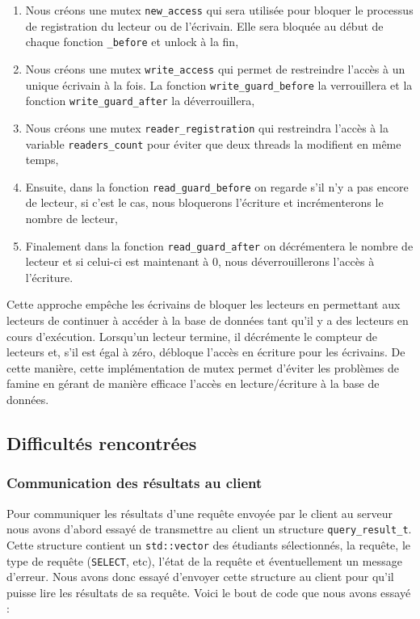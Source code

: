 \documentclass[utf8]{article}
\begin{document}
\begin{enumerate}
	\item Nous créons une mutex \texttt{new\_access} qui sera utilisée pour bloquer le processus de registration du lecteur ou de l'écrivain. Elle sera bloquée au début de chaque fonction \texttt{\_before} et unlock à la fin,
	\item Nous créons une mutex \texttt{write\_access} qui permet de restreindre l'accès à un unique écrivain à la fois. La fonction \texttt{write\_guard\_before} la verrouillera et la fonction \texttt{write\_guard\_after} la déverrouillera,
	\item Nous créons une mutex \texttt{reader\_registration} qui restreindra l'accès à la variable \texttt{readers\_count} pour éviter que deux threads la modifient en même temps,
	\item Ensuite, dans la fonction \texttt{read\_guard\_before} on regarde s'il n'y a pas encore de lecteur, si c'est le cas, nous bloquerons l'écriture et incrémenterons le nombre de lecteur,
	\item Finalement dans la fonction \texttt{read\_guard\_after} on décrémentera le nombre de lecteur et si celui-ci est maintenant à 0, nous déverrouillerons l'accès à l'écriture.
\end{enumerate}

Cette approche empêche les écrivains de bloquer les lecteurs en permettant aux lecteurs de continuer à accéder à la base de données tant qu'il y a des lecteurs en cours d'exécution. Lorsqu'un lecteur termine, il décrémente le compteur de lecteurs et, s'il est égal à zéro, débloque l'accès en écriture pour les écrivains. De cette manière, cette implémentation de mutex permet d'éviter les problèmes de famine en gérant de manière efficace l'accès en lecture/écriture à la base de données.

\subsection{Difficultés rencontrées}

\subsubsection{Communication des résultats au client}


Pour communiquer les résultats d'une requête envoyée par le client au serveur nous avons d'abord essayé de transmettre au client un structure \texttt{query\_result\_t}. Cette structure contient un \texttt{std::vector} des étudiants sélectionnés, la requête, le type de requête (\texttt{SELECT}, etc), l'état de la requête et éventuellement un message d'erreur. Nous avons donc essayé d'envoyer cette structure au client pour qu'il puisse lire les résultats de sa requête. Voici le bout de code que nous avons essayé :
\end{document}
